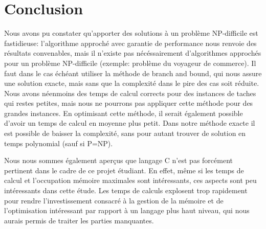 \documentclass[12pt]{article}
\begin{document}
\section{Conclusion}


Nous avons pu constater qu'apporter des solutions à un problème NP-difficile est fastidieuse: l'algorithme approché avec garantie de performance nous renvoie des résultats convenables, mais il n'existe pas nécéssairement d'algorithmes approchés pour un problème NP-difficile (exemple: problème du voyageur de commerce). Il faut dans le cas échéant utiliser la méthode de branch and bound, qui nous assure une solution exacte, mais sans que la complexité dans le pire des cas soit réduite. Nous avons néenmoins des temps de calcul corrects pour des instances de taches qui restes petites, mais nous ne pourrons pas appliquer cette méthode pour des grandes instances. En optimisant cette méthode, il serait également possible d'avoir un temps de calcul en moyenne plus petit. Dans notre méthode exacte il est possible de baisser la complexité, sans pour autant trouver de solution en temps polynomial (sauf si P=NP). 
  
Nous nous sommes également aperçus que langage C n'est pas forcément pertinent dans le cadre de ce projet étudiant. En effet, même si les temps de calcul et l'occupation mémoire maximales sont intéressants, ces aspects sont peu intéressants dans cette étude. Les temps de calculs explosent trop rapidement pour rendre l'investissement consacré à la gestion de la mémoire et de l'optimisation intéressant par rapport à un langage plus haut niveau, qui nous aurais permis de traiter les parties manquantes.\\



\end{document}
